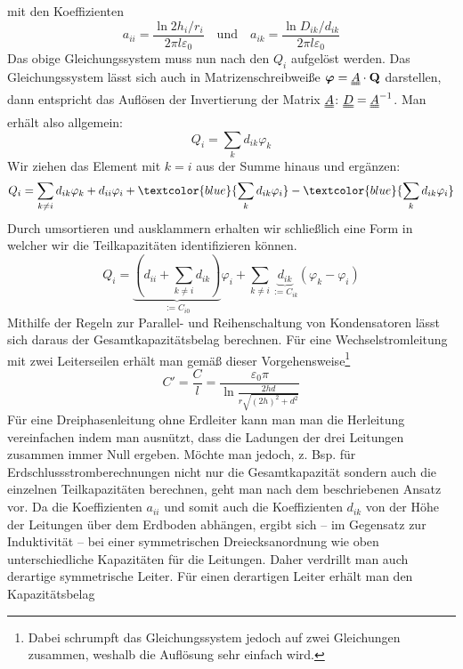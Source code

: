 mit den Koeffizienten
\begin{equation}
a_{ii} = \frac{\ln 2h_i/r_i}{2\pi l \varepsilon_0} \quad \textrm{und} \quad a_{ik} = \frac{\ln D_{ik}/d_{ik}}{2\pi l \varepsilon_0}
\end{equation}
Das obige Gleichungssystem muss nun nach den $Q_i$ aufgelöst werden. Das Gleichungssystem lässt sich auch in Matrizenschreibweiße $\boldsymbol{\varphi} = \uuline{A} \cdot \mathbf{Q}$ darstellen, dann entspricht das Auflösen der Invertierung der Matrix $\uuline{A}$: $\uuline{D}=\uuline{A}^{-1}$. Man erhält also allgemein:
\begin{equation}
Q_i = \sum_k d_{ik}\varphi_k
\end{equation}
Wir ziehen das Element mit $k=i$ aus der Summe hinaus und ergänzen:
\begin{equation}
Q_i = \sum_{k\neq i} d_{ik}\varphi_k + d_{ii}\varphi_i + \textcolor{blue}{\sum_k d_{ik}\varphi_i} - \textcolor{blue}
{\sum_k d_{ik}\varphi_i}
\end{equation}
Durch umsortieren und ausklammern erhalten wir schließlich eine Form in welcher wir die Teilkapazitäten identifizieren können.
\begin{equation}
Q_i = \underbrace{\left(d_{ii}+\sum_{k\neq i}d_{ik}\right)}_{:=C_{i0}}\varphi_i + \sum_{k\neq i} \underbrace{d_{ik}}_{:=C_{ik}} \left( \varphi_k - \varphi_i \right)
\end{equation}
Mithilfe der Regeln zur Parallel- und Reihenschaltung von Kondensatoren lässt sich daraus der Gesamtkapazitätsbelag berechnen.
Für eine Wechselstromleitung mit zwei Leiterseilen erhält man gemäß dieser Vorgehensweise\footnote{Dabei schrumpft das Gleichungssystem jedoch auf zwei Gleichungen zusammen, weshalb die Auflösung sehr einfach wird.}
\begin{equation}
C' = \frac{C}{l} = \frac{\varepsilon_0\pi}{\ln{\frac{2hd}{r\sqrt{\left(2h\right)^2+d^2}}}}
\end{equation}
Für eine Dreiphasenleitung ohne Erdleiter kann man man die Herleitung vereinfachen indem man ausnützt, dass die Ladungen der drei Leitungen zusammen immer Null ergeben. Möchte man jedoch, z. Bsp. für  Erdschlussstromberechnungen nicht nur die Gesamtkapazität sondern auch die einzelnen Teilkapazitäten berechnen, geht man nach dem beschriebenen Ansatz vor.
Da die Koeffizienten $a_{ii}$ und somit auch die Koeffizienten $d_{ik}$ von der Höhe der Leitungen über dem Erdboden abhängen, ergibt sich -- im Gegensatz zur Induktivität -- bei einer symmetrischen Dreiecksanordnung wie oben %
unterschiedliche Kapazitäten für die Leitungen. Daher verdrillt man auch derartige symmetrische Leiter. Für einen derartigen Leiter erhält man den Kapazitätsbelag
